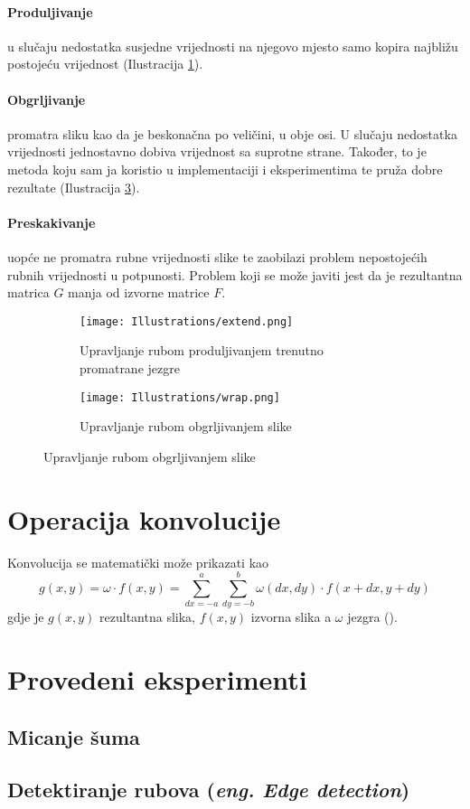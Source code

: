 \paragraph{Produljivanje}
u slučaju nedostatka susjedne vrijednosti na njegovo mjesto samo kopira najbližu postojeću vrijednost (Ilustracija \ref{fig:extend_edge}).

\paragraph{Obgrljivanje}
promatra sliku kao da je beskonačna po veličini, u obje osi.
U slučaju nedostatka vrijednosti  jednostavno dobiva vrijednost sa suprotne strane.
Također, to je metoda koju sam ja koristio u implementaciji i eksperimentima te pruža dobre rezultate (Ilustracija \ref{fig:wrap_edge}).

\paragraph{Preskakivanje}
uopće ne promatra rubne vrijednosti slike te zaobilazi problem nepostojećih rubnih vrijednosti u potpunosti.
Problem koji se može javiti jest da je rezultantna matrica $G$ manja od izvorne matrice $F$.

\begin{figure}
	\caption{Grafički prikaz dva različita načina upravljanja rubnim vrijednostima s označenim rubom slike i trenutnom pozicijom jezgre}
	\begin{subfigure}[t]{0.48\textwidth}
		\texttt{[image: Illustrations/extend.png]}
		\caption{Upravljanje rubom produljivanjem trenutno promatrane jezgre}
		\label{fig:extend_edge}
	\end{subfigure}
	\begin{subfigure}[t]{0.48\textwidth}
		\texttt{[image: Illustrations/wrap.png]}
		\caption{Upravljanje rubom obgrljivanjem slike}
		\label{fig:wrap_edge}
	\end{subfigure}
\end{figure}

\section{Operacija konvolucije}
Konvolucija se matematički može prikazati kao
$$g(x, y) = \omega \cdot f(x,y) = \sum_{dx=-a}^{a} \sum_{dy=-b}^{b} \omega(dx, dy)\cdot f(x + dx, y + dy)$$
gdje je $g(x,y)$ rezultantna slika, $f(x, y)$ izvorna slika a $\omega$ jezgra (\cite{conv_wiki}).

\section{Provedeni eksperimenti}

\subsection{Micanje šuma}


\subsection{Detektiranje rubova (\emph{eng. Edge detection})}

